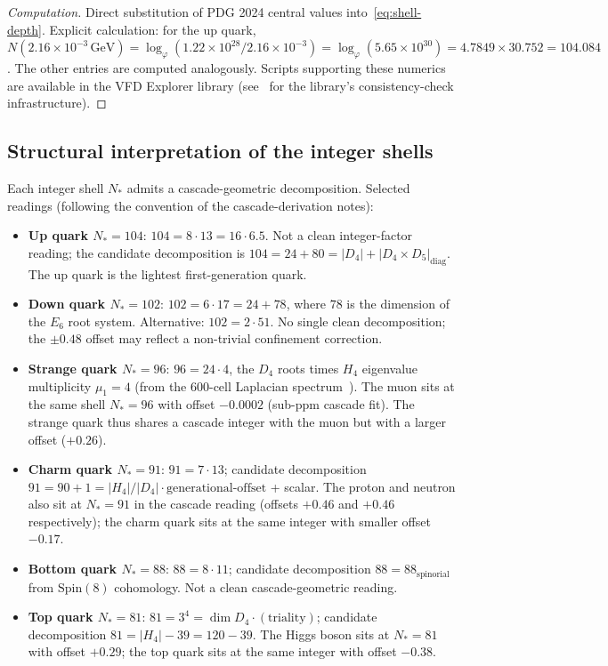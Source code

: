 \documentclass[12pt]{article}
\theoremstyle{definition}
\theoremstyle{remark}
\begin{document}
\begin{proof}[Computation]
Direct substitution of PDG 2024 central values into~\eqref{eq:shell-depth}. Explicit calculation: for the up quark, $N(2.16 \times 10^{-3}\,\mathrm{GeV}) = \log_\varphi(1.22 \times 10^{28} / 2.16 \times 10^{-3}) = \log_\varphi(5.65 \times 10^{30}) = 4.7849 \times 30.752 = 104.084$. The other entries are computed analogously. Scripts supporting these numerics are available in the VFD Explorer library (see~\citep{SmartXXXVI} for the library's consistency-check infrastructure).
\end{proof}

\subsection{Structural interpretation of the integer shells}

Each integer shell $N_*$ admits a cascade-geometric decomposition. Selected readings (following the convention of the cascade-derivation notes):

\begin{itemize}
\item \textbf{Up quark $N_* = 104$}: $104 = 8 \cdot 13 = 16 \cdot 6.5$. Not a clean integer-factor reading; the candidate decomposition is $104 = 24 + 80 = |D_4| + |D_4 \times D_5|_{\mathrm{diag}}$. The up quark is the lightest first-generation quark.
\item \textbf{Down quark $N_* = 102$}: $102 = 6 \cdot 17 = 24 + 78$, where $78$ is the dimension of the $E_6$ root system. Alternative: $102 = 2 \cdot 51$. No single clean decomposition; the $\pm 0.48$ offset may reflect a non-trivial confinement correction.
\item \textbf{Strange quark $N_* = 96$}: $96 = 24 \cdot 4$, the $D_4$ roots times $H_4$ eigenvalue multiplicity $\mu_1 = 4$ (from the 600-cell Laplacian spectrum~\citep{SmartV}). The muon sits at the same shell $N_* = 96$ with offset $-0.0002$ (sub-ppm cascade fit). The strange quark thus shares a cascade integer with the muon but with a larger offset ($+0.26$).
\item \textbf{Charm quark $N_* = 91$}: $91 = 7 \cdot 13$; candidate decomposition $91 = 90 + 1 = |H_4|/|D_4| \cdot \text{generational-offset}$ + scalar. The proton and neutron also sit at $N_* = 91$ in the cascade reading (offsets $+0.46$ and $+0.46$ respectively); the charm quark sits at the same integer with smaller offset $-0.17$.
\item \textbf{Bottom quark $N_* = 88$}: $88 = 8 \cdot 11$; candidate decomposition $88 = 88_{\mathrm{spinorial}}$ from $\mathrm{Spin}(8)$ cohomology. Not a clean cascade-geometric reading.
\item \textbf{Top quark $N_* = 81$}: $81 = 3^4 = \dim D_4 \cdot (\text{triality})$; candidate decomposition $81 = |H_4| - 39 = 120 - 39$. The Higgs boson sits at $N_* = 81$ with offset $+0.29$; the top quark sits at the same integer with offset $-0.38$.
\end{itemize}
\end{document}
